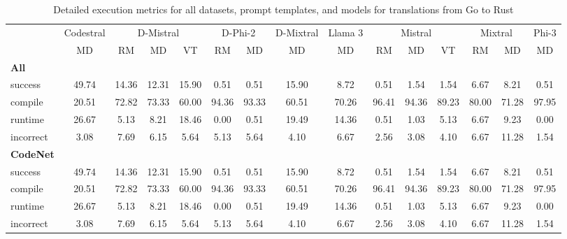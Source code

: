 \begin{table}[t]
\caption{Detailed execution metrics for all datasets, prompt templates, and models for translations from Go to Rust}
\label{tab:iteration_1_stats_percent_Go_Rust}

\setlength{\tabcolsep}{2.5pt} %
\renewcommand{\arraystretch}{1} %

\footnotesize
\begin{tabular}{@{}lcccccccccccccc@{}}
\toprule
 & Codestral & \multicolumn{3}{c}{D-Mistral} & \multicolumn{2}{c}{D-Phi-2} & D-Mixtral & Llama 3 & \multicolumn{3}{c}{Mistral}  & \multicolumn{2}{c}{Mixtral} & Phi-3 \\ 

\cmidrule(l){2-2}
\cmidrule(l){3-5}
\cmidrule(l){6-7}
\cmidrule(l){8-8}
\cmidrule(l){9-9}
\cmidrule(l){10-12}
\cmidrule(l){13-14}
\cmidrule(l){15-15}

& \multicolumn{1}{c}{MD}
& \multicolumn{1}{c}{RM}
& \multicolumn{1}{c}{MD}
& \multicolumn{1}{c}{VT}
& \multicolumn{1}{c}{RM}
& \multicolumn{1}{c}{MD} 
& \multicolumn{1}{c}{MD} 
& \multicolumn{1}{c}{MD} 
& \multicolumn{1}{c}{RM} 
& \multicolumn{1}{c}{MD} 
& \multicolumn{1}{c}{VT} 
& \multicolumn{1}{c}{RM}
& \multicolumn{1}{c}{MD} 
& \multicolumn{1}{c}{MD} \\

\midrule
\textbf{All} & & & & & & & & & & & & & & \\ 
\quad success & 49.74 & 14.36 & 12.31 & 15.90 & 0.51 & 0.51 & 15.90 & 8.72 & 0.51 & 1.54 & 1.54 & 6.67 & 8.21 & 0.51 \\
\qquad compile & 20.51 & 72.82 & 73.33 & 60.00 & 94.36 & 93.33 & 60.51 & 70.26 & 96.41 & 94.36 & 89.23 & 80.00 & 71.28 & 97.95 \\
\qquad runtime & 26.67 & 5.13 & 8.21 & 18.46 & 0.00 & 0.51 & 19.49 & 14.36 & 0.51 & 1.03 & 5.13 & 6.67 & 9.23 & 0.00 \\
\qquad incorrect & 3.08 & 7.69 & 6.15 & 5.64 & 5.13 & 5.64 & 4.10 & 6.67 & 2.56 & 3.08 & 4.10 & 6.67 & 11.28 & 1.54 \\
 

\textbf{CodeNet} & & & & & & & & & & & & & & \\ 
\quad success & 49.74 & 14.36 & 12.31 & 15.90 & 0.51 & 0.51 & 15.90 & 8.72 & 0.51 & 1.54 & 1.54 & 6.67 & 8.21 & 0.51 \\
\qquad compile & 20.51 & 72.82 & 73.33 & 60.00 & 94.36 & 93.33 & 60.51 & 70.26 & 96.41 & 94.36 & 89.23 & 80.00 & 71.28 & 97.95 \\
\qquad runtime & 26.67 & 5.13 & 8.21 & 18.46 & 0.00 & 0.51 & 19.49 & 14.36 & 0.51 & 1.03 & 5.13 & 6.67 & 9.23 & 0.00 \\
\qquad incorrect & 3.08 & 7.69 & 6.15 & 5.64 & 5.13 & 5.64 & 4.10 & 6.67 & 2.56 & 3.08 & 4.10 & 6.67 & 11.28 & 1.54 \\
 

\bottomrule
\end{tabular}
\end{table}





